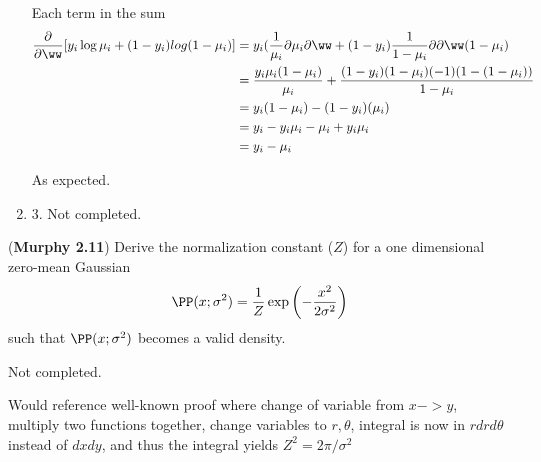 \documentclass[12pt,letterpaper]{hmcpset}
\begin{document}
\begin{solution}
\begin{enumerate}
Each term in the sum
\begin{equation}\begin{aligned}
    \frac{\partial}{\partial \ww} [ y_i \log \mu_i + (1 - y_i)log(1 - \mu_i) ]
    & = y_i (\frac{1}{\mu_i}{\partial \mu_i}{\partial \ww} + (1 - y_i)\frac{1}{1 - \mu_i}{\partial }{\partial \ww}(1-\mu_i) \\
    & = \frac{ y_i \mu_i (1 - \mu_i) }{\mu_i} + \frac{ (1 - y_i)(1 - \mu_i)(-1)(1 - (1 - \mu_i)) }{ 1 - \mu_i } \\
    & = y_i (1 - \mu_i) - (1 - y_i)(\mu_i) \\
    & = y_i - y_i \mu_i - \mu_i + y_i \mu_i \\
    & = y_i - \mu_i
\end{aligned}\end{equation}

As expected.

\item 3. Not completed.
  
\end{enumerate}

	\vfill
\end{solution}
\newpage

\begin{problem}[2]
	(\textbf{Murphy 2.11})
	Derive the normalization constant ($Z$) for a one dimensional
	zero-mean Gaussian
	\[
	\PP(x; \sigma^2) = \frac{1}{Z}\exp\left(-\frac{x^2}{2\sigma^2}\right)
	\]
	such that $\PP(x; \sigma^2)$ becomes a valid density.
\end{problem}
\begin{solution}

        Not completed.

        Would reference well-known proof where change of variable from $x -> y$, multiply two functions together,
        change variables to $r, \theta $, integral is now in $r dr d\theta$ instead of $ dx dy $, and
        thus the integral yields $Z^2 = 2\pi / \sigma^2$
	\vfill


\end{solution}
\newpage
\end{document}
